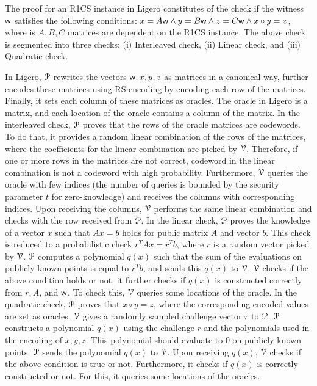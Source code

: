 The proof for an R1CS instance in Ligero constitutes of the check if the witness $\mathsf{w}$ satisfies the following conditions: $x = A \mathsf{w} \land y = B \mathsf{w} \land z = C \mathsf{w} \land x \circ y = z$, where is $A, B, C$ matrices are dependent on the R1CS instance. The above check is segmented into three checks: (i) Interleaved check, (ii) Linear check, and (iii) Quadratic check. 

In Ligero, $\mathcal{P}$ rewrites the vectors $\mathsf{w}, x, y, z$ as matrices in a canonical way, further encodes these matrices using RS-encoding by encoding each row of the matrices. Finally, it sets each column of these matrices as oracles. The oracle in Ligero is a matrix, and each location of the oracle contains a column of the matrix.
In the interleaved check, $\mathcal{P}$ proves that the rows of the oracle matrices are codewords. To do that, it provides a random linear combination of the rows of the matrices, where the coefficients for the linear combination are picked by $\mathcal{V}$. Therefore, if one or more rows in the matrices are not correct, codeword in the linear combination is not a codeword with high probability. Furthermore, $\mathcal{V}$ queries the oracle with few indices (the number of queries is bounded by the security parameter $t$ for zero-knowledge) and receives the columns with corresponding indices. Upon receiving the columns, $\mathcal{V}$ performs the same linear combination and checks with the row received from $\mathcal{P}$.
In the linear check, $\mathcal{P}$ proves the knowledge of a vector $x$ such that $Ax = b$ holds for public matrix $A$ and vector $b$. This check is reduced to a probabilistic check $r^TAx = r^T b$, where $r$ is a random vector picked by $\mathcal{V}$. $\mathcal{P}$ computes a polynomial $q(x)$ such that the sum of the evaluations on publicly known points is equal to $r^Tb$, and sends this $q(x)$ to $\mathcal{V}$. $\mathcal{V}$ checks if the above condition holds or not, it further checks if $q(x)$ is constructed correctly from $r, A$, and $\mathsf{w}$. To check this, $\mathcal{V}$ queries some locations of the oracle.
In the quadratic check, $\mathcal{P}$ proves that $x \circ y = z$, where the corresponding encoded values are set as oracles. $\mathcal{V}$ gives a randomly sampled challenge vector $r$ to $\mathcal{P}$. $\mathcal{P}$ constructs a polynomial $q(x)$ using the challenge $r$ and the polynomials used in the encoding of $x, y, z$. This polynomial should evaluate to $0$ on publicly known points. $\mathcal{P}$ sends the polynomial $q(x)$ to $\mathcal{V}$. Upon receiving $q(x)$, $\mathcal{V}$ checks if the above condition is true or not. Furthermore, it checks if $q(x)$ is correctly constructed or not. For this, it queries some locations of the oracles.

